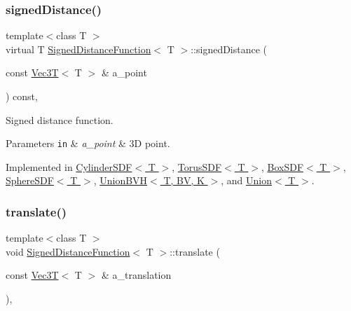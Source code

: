 \subsubsection{\texorpdfstring{signed\+Distance()}{signedDistance()}}
{\footnotesize\ttfamily template$<$class T $>$ \\
virtual T \hyperlink{classSignedDistanceFunction}{Signed\+Distance\+Function}$<$ T $>$\+::signed\+Distance (\begin{DoxyParamCaption}\item[{const \hyperlink{classVec3T}{Vec3T}$<$ T $>$ \&}]{a\+\_\+point }\end{DoxyParamCaption}) const\hspace{0.3cm}{\ttfamily [pure virtual]}, {\ttfamily [noexcept]}}



Signed distance function. 


\begin{DoxyParams}[1]{Parameters}
\mbox{\tt in}  & {\em a\+\_\+point} & 3D point. \\
\hline
\end{DoxyParams}


Implemented in \hyperlink{classCylinderSDF_a082c08089b07402d55020ed8186cc992}{Cylinder\+S\+D\+F$<$ T $>$}, \hyperlink{classTorusSDF_a23b4d455de2b7b9988ce81833ccd5302}{Torus\+S\+D\+F$<$ T $>$}, \hyperlink{classBoxSDF_a6e7a72790061423e5c9ea47d9e26736f}{Box\+S\+D\+F$<$ T $>$}, \hyperlink{classSphereSDF_a9b0c5f0b1af2c4b62bee1c873e0158e8}{Sphere\+S\+D\+F$<$ T $>$}, \hyperlink{classUnionBVH_a9681fdc161e2e077a33caaddb78fb4ba}{Union\+B\+V\+H$<$ T, B\+V, K $>$}, and \hyperlink{classUnion_a08beffd354ca261e3d31bcb453951810}{Union$<$ T $>$}.

\mbox{\label{classSignedDistanceFunction_add71ebc2e7f3fb5e85766898413482e7}} 
\subsubsection{\texorpdfstring{translate()}{translate()}}
{\footnotesize\ttfamily template$<$class T $>$ \\
void \hyperlink{classSignedDistanceFunction}{Signed\+Distance\+Function}$<$ T $>$\+::translate (\begin{DoxyParamCaption}\item[{const \hyperlink{classVec3T}{Vec3T}$<$ T $>$ \&}]{a\+\_\+translation }\end{DoxyParamCaption})\hspace{0.3cm}{\ttfamily [inline]}, {\ttfamily [noexcept]}}




